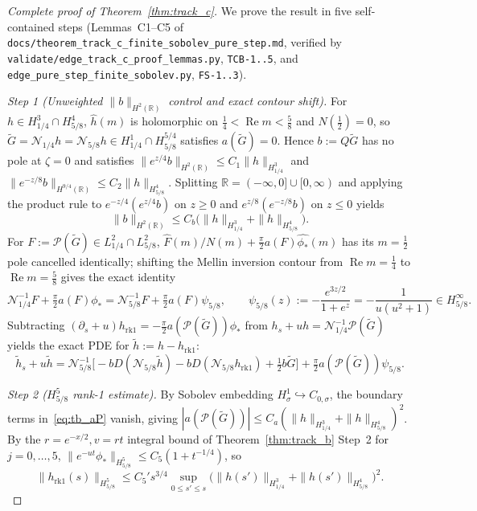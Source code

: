 \documentclass[11pt,a4paper]{article}
\begin{document}
\begin{proof}[Complete proof of Theorem~\ref{thm:track_c}]
We prove the result in five self-contained steps (Lemmas~C1--C5 of \texttt{docs/theorem\_track\_c\_finite\_sobolev\_pure\_step.md}, verified by \texttt{validate/edge\_track\_c\_proof\_lemmas.py}, \texttt{TCB-1..5}, and \texttt{edge\_pure\_step\_finite\_sobolev.py}, \texttt{FS-1..3}).

\emph{Step 1 (Unweighted $\|b\|_{H^2(\mathbb{R})}$ control and exact contour shift).}
For $h\in H^3_{1/4}\cap H^4_{5/8}$, $\widehat h(m)$ is holomorphic on $\tfrac14<\operatorname{Re}m<\tfrac58$ and $N(\tfrac12)=0$, so $\widetilde G=\mathcal{N}_{1/4}h=\mathcal{N}_{5/8}h\in H^1_{1/4}\cap H^{5/4}_{5/8}$ satisfies $a(\widetilde G)=0$.  Hence $b:=Q\widetilde G$ has no pole at $\zeta=0$ and satisfies $\|e^{z/4}b\|_{H^2(\mathbb{R})}\le C_1\|h\|_{H^3_{1/4}}$ and $\|e^{-z/8}b\|_{H^{9/4}(\mathbb{R})}\le C_2\|h\|_{H^4_{5/8}}$.  Splitting $\mathbb{R}=(-\infty,0]\cup[0,\infty)$ and applying the product rule to $e^{-z/4}(e^{z/4}b)$ on $z\ge 0$ and $e^{z/8}(e^{-z/8}b)$ on $z\le 0$ yields
\begin{equation}\label{eq:tc_bH2}
\|b\|_{H^2(\mathbb{R})}\le C_b\bigl(\|h\|_{H^3_{1/4}}+\|h\|_{H^4_{5/8}}\bigr).
\end{equation}
For $F:=\mathcal{P}(\widetilde G)\in L^2_{1/4}\cap L^2_{5/8}$, $\widehat F(m)/N(m)+\tfrac{\pi}{2}a(F)\widehat{\phi_*}(m)$ has its $m=\tfrac12$ pole cancelled identically; shifting the Mellin inversion contour from $\operatorname{Re}m=\tfrac14$ to $\operatorname{Re}m=\tfrac58$ gives the exact identity
\begin{equation}\label{eq:tc_shift}
\mathcal{N}_{1/4}^{-1}F+\tfrac{\pi}{2}a(F)\phi_*=\mathcal{N}_{5/8}^{-1}F+\tfrac{\pi}{2}a(F)\psi_{5/8},\qquad
\psi_{5/8}(z):=-\frac{e^{3z/2}}{1+e^z}=-\frac{1}{u(u^2+1)}\in H^\infty_{5/8}.
\end{equation}
Subtracting $(\partial_s+u)h_{\mathrm{rk1}}=-\tfrac{\pi}{2}a(\mathcal{P}(\widetilde G))\phi_*$ from $h_s+u h=\mathcal{N}_{1/4}^{-1}\mathcal{P}(\widetilde G)$ yields the exact PDE for $\tilde h:=h-h_{\mathrm{rk1}}$:
\begin{equation}\label{eq:tc_htilde}
\tilde h_s+u\tilde h=\mathcal{N}_{5/8}^{-1}\bigl[-b D(\mathcal{N}_{5/8}\tilde h)-b D(\mathcal{N}_{5/8}h_{\mathrm{rk1}})+\tfrac12 b\widetilde G\bigr]+\tfrac{\pi}{2}a(\mathcal{P}(\widetilde G))\psi_{5/8}.
\end{equation}

\emph{Step 2 ($H^5_{5/8}$ rank-1 estimate).}
By Sobolev embedding $H^1_\sigma\hookrightarrow C_{0,\sigma}$, the boundary terms in~\eqref{eq:tb_aP} vanish, giving $|a(\mathcal{P}(\widetilde G))|\le C_a(\|h\|_{H^3_{1/4}}+\|h\|_{H^4_{5/8}})^2$.  By the $r=e^{-x/2}, v=rt$ integral bound of Theorem~\ref{thm:track_b} Step~2 for $j=0,\dots,5$, $\|e^{-ut}\phi_*\|_{H^5_{5/8}}\le C_5(1+t^{-1/4})$, so
\begin{equation}\label{eq:tc_rk1}
\|h_{\mathrm{rk1}}(s)\|_{H^5_{5/8}}\le C_5' s^{3/4}\sup_{0\le s'\le s}\bigl(\|h(s')\|_{H^3_{1/4}}+\|h(s')\|_{H^4_{5/8}}\bigr)^2.
\end{equation}


\end{proof}
\end{document}
